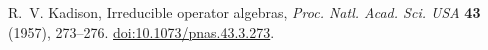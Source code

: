  R.~V. Kadison, Irreducible operator algebras, \emph{Proc. Natl. Acad. Sci. USA} \textbf{43} (1957), 273--276. \href{https://doi.org/10.1073/pnas.43.3.273}{doi:10.1073/pnas.43.3.273}.
